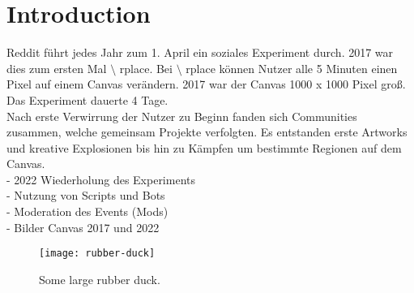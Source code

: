 \section{Introduction} \label{introduction}

Reddit führt jedes Jahr zum 1. April ein soziales Experiment durch. 2017 war dies zum ersten Mal $\setminus$ rplace. Bei $\setminus$ rplace k{\"o}nnen Nutzer alle 5 Minuten einen Pixel auf einem Canvas verändern. 2017 war der Canvas 1000 x 1000 Pixel gro{\ss}. Das Experiment dauerte 4 Tage. \\
Nach erste Verwirrung der Nutzer zu Beginn fanden sich Communities zusammen, welche gemeinsam Projekte verfolgten. Es entstanden erste Artworks und kreative Explosionen bis hin zu Kämpfen um bestimmte Regionen auf dem Canvas.\\
- 2022 Wiederholung des Experiments\\
- Nutzung von Scripts und Bots\\
- Moderation des Events (Mods)\\
- Bilder Canvas 2017 und 2022



\begin{figure}[t]
    \centering
    \texttt{[image: rubber-duck]}
    \caption{Some large rubber duck.}
    \label{rubber-duck}
\end{figure}

